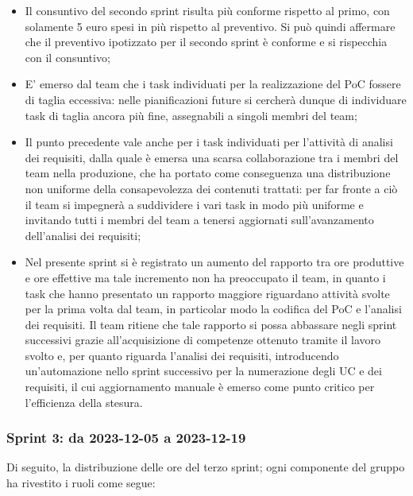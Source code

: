 \documentclass[10pt, a4paper]{article}
\begin{document}
\begin{itemize}
    \item Il consuntivo del secondo sprint risulta più conforme rispetto al primo, con solamente 5 euro spesi in più rispetto al preventivo. 
    Si può quindi affermare che il preventivo ipotizzato per il secondo sprint è conforme e si rispecchia con il consuntivo;
    \item E' emerso dal team che i task individuati per la realizzazione del PoC fossere di taglia eccessiva: nelle pianificazioni future si cercherà
    dunque di individuare task di taglia ancora più fine, assegnabili a singoli membri del team;
    \item Il punto precedente vale anche per i task individuati per l'attività di analisi dei requisiti, dalla quale è emersa una scarsa collaborazione
    tra i membri del team nella produzione, che ha portato come conseguenza una distribuzione non uniforme della consapevolezza dei contenuti trattati: per 
    far fronte a ciò il team si impegnerà a suddividere i vari task in modo più uniforme e invitando tutti i membri del team a tenersi aggiornati 
    sull'avanzamento dell'analisi dei requisiti;
    \item Nel presente sprint si è registrato un aumento del rapporto tra ore produttive e ore effettive ma tale incremento non ha preoccupato il team, 
    in quanto i task che hanno presentato un rapporto maggiore riguardano attività svolte per la prima volta dal team, in particolar modo la codifica del PoC
    e l'analisi dei requisiti. Il team ritiene che tale rapporto si possa abbassare negli sprint successivi grazie all'acquisizione di competenze ottenuto tramite
    il lavoro svolto e, per quanto riguarda l'analisi dei requisiti, introducendo un'automazione nello sprint successivo per la numerazione degli UC e dei requisiti, 
    il cui aggiornamento manuale è emerso come punto critico per l'efficienza della stesura.
\end{itemize}
\subsubsection{Sprint 3: da 2023-12-05 a 2023-12-19}
Di seguito, la distribuzione delle ore del terzo sprint; ogni componente del gruppo ha rivestito i ruoli come segue:
\end{document}
